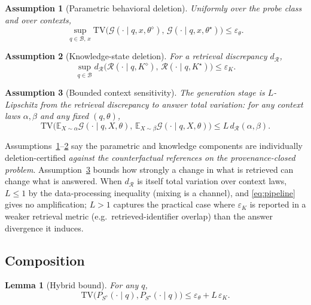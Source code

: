 \documentclass[10pt,journal,compsoc]{IEEEtran}
\newtheorem{assumption}{Assumption}
\newtheorem{lemma}{Lemma}
\begin{document}
\begin{assumption}[Parametric behavioral deletion]
\label{a:theta}
Uniformly over the probe class and over contexts,
\[
 \sup_{q\in\mathcal{B},\,x}
 \mathrm{TV}\!\big(\mathcal{G}(\cdot\mid q,x,\theta^{\diamond}),\,
 \mathcal{G}(\cdot\mid q,x,\theta^{\star})\big)\le\varepsilon_{\theta}.
\]
\end{assumption}

\begin{assumption}[Knowledge-state deletion]
\label{a:k}
For a retrieval discrepancy $d_{\mathcal{R}}$,
\[
 \sup_{q\in\mathcal{B}}
 d_{\mathcal{R}}\!\big(\mathcal{R}(\cdot\mid q,K^{\diamond}),\,
 \mathcal{R}(\cdot\mid q,K^{\star})\big)\le\varepsilon_{K}.
\]
\end{assumption}

\begin{assumption}[Bounded context sensitivity]
\label{a:lip}
The generation stage is $L$-Lipschitz from the retrieval discrepancy to
answer total variation: for any context laws $\alpha,\beta$ and any
fixed $(q,\theta)$,
\[
 \mathrm{TV}\!\Big(\mathbb{E}_{X\sim\alpha}\mathcal{G}(\cdot\mid q,X,\theta),\,
 \mathbb{E}_{X\sim\beta}\mathcal{G}(\cdot\mid q,X,\theta)\Big)
 \le L\, d_{\mathcal{R}}(\alpha,\beta).
\]
\end{assumption}

Assumptions~\ref{a:theta}--\ref{a:k} say the parametric and knowledge
components are individually deletion-certified \emph{against the
counterfactual references on the provenance-closed problem}.
Assumption~\ref{a:lip} bounds how strongly a change in what is retrieved
can change what is answered. When $d_{\mathcal{R}}$ is itself total
variation over context laws, $L\le 1$ by the data-processing inequality
(mixing is a channel), and \eqref{eq:pipeline} gives no amplification;
$L>1$ captures the practical case where $\varepsilon_{K}$ is reported in
a weaker retrieval metric (e.g.\ retrieved-identifier overlap) than the
answer divergence it induces.

\subsection{Composition}

\begin{lemma}[Hybrid bound]
\label{lem:hybrid}
For any $q$,
\[
 \mathrm{TV}\!\big(P_{S^{\diamond}}(\cdot\mid q),P_{S^{\star}}(\cdot\mid q)\big)
 \le \varepsilon_{\theta} + L\,\varepsilon_{K}.
\]
\end{lemma}
\end{document}
